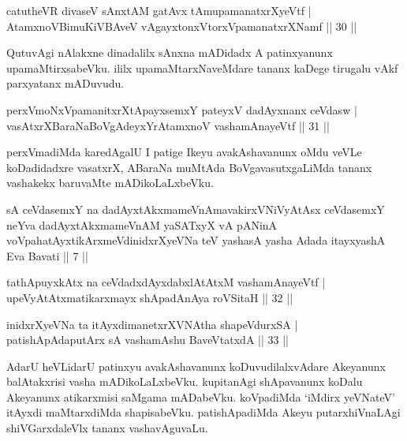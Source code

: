
\begin{shl}
catutheVR divaseV sAnxtAM gatAvx tAmupamanatxrXyeVtf | \\
AtamxnoV\s BimuKiVBAveV vAgayxtonxV\s torxVpamanatxrXNamf \hfill|| 30 || 
\end{shl}

\begin{artha}
QutuvAgi nAlakxne dinadalilx sAnxna mADidadx A patinxyanunx upamaMtirxsabeVku. ililx upamaMtarxNaveMdare tananx kaDege tirugalu vAkf parxyatanx mADuvudu.
\end{artha}

\begin{shl}
perxVmoNxVpamanitxrXtA\s payxsemxY pateyxV dadAyxnanx ceVdasw | \\
vasAtxrXBaraNaBoVgAdeyxYrAtamxnoV vashamAnayeVtf \hfill|| 31 ||  
\end{shl}

\begin{artha}
perxVmadiMda karedAgalU I patige Ikeyu avakAshavanunx oMdu veVLe 
koDadidadxre vasatxrX, ABaraNa muMtAda BoVgavasutxgaLiMda tananx 
vashakekx baruvaMte mADikoLaLxbeVku.
\end{artha}


\begin{shl}
sA ceVdasemxY na dadAyxtAkxmameVnAmavakirxVNiVyAtAsx ceVdasemxY neYva dadAyxtAkxmameVnAM yaSATxyX vA pANinA voVpahatAyxtikArxmeVdinidxrXyeVNa teV yashasA yasha Adada itayxyashA Eva Bavati || 7 ||
\end{shl}

\begin{shl}
tathA\s puyxkAtx na ceVdadxdAyxdabxlAtAtxM vashamAnayeVtf | \\
upeVyAtAtxmatikarxmayx shApadAnAya roVSitaH \hfill|| 32 || 
\end{shl}

\begin{shl}
inidxrXyeVNa ta itAyxdimanetxrXVNAtha shapeVdurxSA | \\
patishApAdaputArx sA vashamAshu BaveVtatxdA \hfill|| 33 || 
\end{shl}

\begin{artha}
AdarU heVLidarU patinxyu avakAshavanunx koDuvudilalxvAdare Akeyanunx 
balAtakxrisi vasha mADikoLaLxbeVku. kupitanAgi shApavanunx koDalu 
Akeyanunx atikarxmisi saMgama mADabeVku. koVpadiMda `iMdirx yeVNateV' itAyxdi 
maMtarxdiMda shapisabeVku. patishApadiMda Akeyu putarxhiVnaLAgi 
shiVGarxdaleVlx tananx vashavAguvaLu.
\end{artha}

